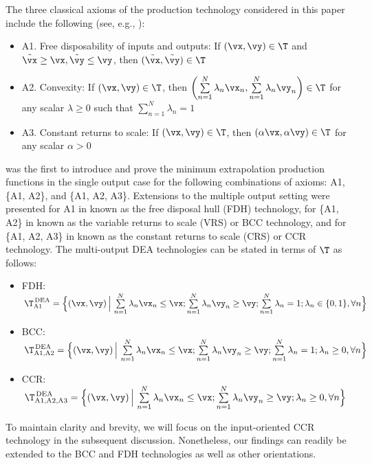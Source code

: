 {The three classical axioms of the production technology considered in this paper include the following (see, e.g., \cite{Koopmans1951,Afriat1972,Fare1995}):
\begin{itemize}
    \item[] A1. Free disposability of inputs and outputs: If $(\vx,\vy) \in \T$ and $\tilde{\vx} \geq \vx, \tilde{\vy} \leq \vy$, then $(\tilde{\vx},\tilde{\vy}) \in \T$
    \item[] A2. Convexity: If $(\vx,\vy) \in \T$, then $\left( \sum\limits_{n=1}^N \lambda_n\vx_n, \sum\limits_{n=1}^N \lambda_n\vy_n \right) \in \T$ for any scalar $\lambda \ge 0$ such that $\sum\limits_{n=1}^N \lambda_n =1$
    \item[] A3. Constant returns to scale: If $(\vx,\vy) \in \T$, then $(\alpha\vx,\alpha\vy) \in \T$ for any scalar $\alpha > 0$
\end{itemize}
\textcite{Afriat1972} was the first to introduce and prove the minimum extrapolation production functions in the single output case for the following combinations of axioms: A1, \{A1, A2\}, and \{A1, A2, A3\}. Extensions to the multiple output setting were presented for A1 in \textcite{tulkens_fdh_1993} known as the free disposal hull (FDH) technology, for \{A1, A2\} in \textcite{banker1984} known as the variable returns to scale (VRS) or BCC technology, and for \{A1, A2, A3\} in \textcite{Charnes1978} known as the constant returns to scale (CRS) or CCR technology. The multi-output DEA technologies can be stated in terms of $\T$ as follows:
\begin{itemize}
    \item[] FDH: $\,\T_{\text{A1}}^{\,\text{DEA}} = \Bigl\{ (\vx,\vy)\,\Big|\,\sum\limits_{n=1}^N \lambda_n\vx_n \le \vx;\sum\limits_{n=1}^N \lambda_n\vy_n \ge \vy;\sum\limits_{n=1}^N \lambda_n =1;\lambda_n \in \{0,1\},\forall n \Bigl\} $
    \item[] BCC: $\,\T_{\text{A1,A2}}^{\,\text{DEA}} = \Bigl\{ (\vx,\vy)\,\Big|\,\sum\limits_{n=1}^N \lambda_n\vx_n \le \vx;\sum\limits_{n=1}^N \lambda_n\vy_n \ge \vy;\sum\limits_{n=1}^N \lambda_n =1;\lambda_n \ge 0,\forall n \Bigl\} $
    \item[] CCR: $\,\T_{\text{A1,A2,A3}}^{\,\text{DEA}} = \Bigl\{ (\vx,\vy)\,\Big|\,\sum\limits_{n=1}^N \lambda_n\vx_n \le \vx;\sum\limits_{n=1}^N \lambda_n\vy_n \ge \vy;\lambda_n \ge 0,\forall n \Bigl\} $
\end{itemize}
To maintain clarity and brevity, we will focus on the input-oriented CCR technology in the subsequent discussion. Nonetheless, our findings can readily be extended to the BCC and FDH technologies as well as other orientations. 

}
